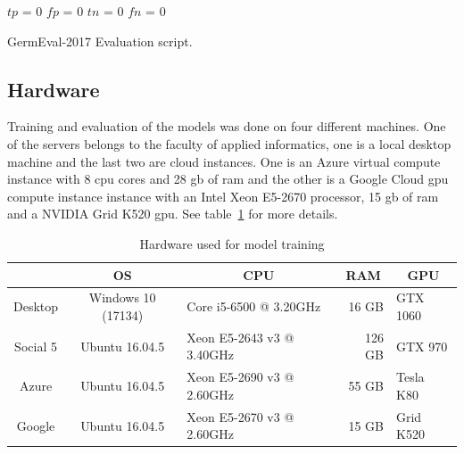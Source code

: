 \begin{algorithm}
	
	
	
	$tp$ = 0
	$fp$ = 0
	$tn$ = 0	
	$fn$ = 0
	
	
	
	\caption{GermEval-2017 Evaluation script.}
	\label{algo:05_germeval}
\end{algorithm}

\subsection{Hardware}

Training and evaluation of the models was done on four different machines. One of the servers belongs to the faculty of applied informatics, one is a local desktop machine and the last two are cloud instances. One is an Azure virtual compute instance with 8 \gls{cpu} cores and 28 \gls{gb} of \gls{ram} and the other is a Google Cloud \gls{gpu} compute instance instance with an Intel Xeon E5-2670 processor, 15 \gls{gb} of \gls{ram} and a NVIDIA Grid K520 \gls{gpu}. See table~\ref{tab:05_usedHardware} for more details.
\begin{table}
	\centering
	\caption{Hardware used for model training}
	\label{tab:05_usedHardware}
	\begin{tabular}{@{}cclrl@{}}
		\toprule
		\multicolumn{1}{c}{\textbf{}}    & \multicolumn{1}{c}{\textbf{OS}} & \multicolumn{1}{c}{\textbf{CPU}}                    & \multicolumn{1}{c}{\textbf{RAM}} & \multicolumn{1}{c}{\textbf{GPU}}     \\ \midrule
		Desktop      & Windows 10 (17134)        & Core i5-6500 @ 3.20GHz     & 16 GB        & GTX 1060 \\
		Social 5     & Ubuntu 16.04.5            & Xeon E5-2643 v3 @ 3.40GHz  & 126 GB        & GTX 970 \\ 
		Azure        & Ubuntu 16.04.5            & Xeon E5-2690 v3 @ 2.60GHz  & 55 GB        & Tesla K80 \\ 
		Google        & Ubuntu 16.04.5            & Xeon E5-2670 v3 @ 2.60GHz  & 15 GB        & Grid K520 \\
		
		\bottomrule
	\end{tabular}
\end{table}


